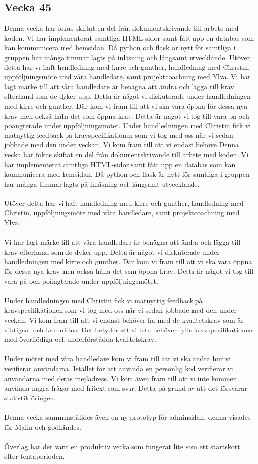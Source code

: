 \documentclass[12pt]{article}
\begin{document}
    \subsection{Vecka 45}
 Denna vecka har fokus skiftat en del från dokumentskrivande till arbete med koden. Vi har implementerat samtliga HTML-sidor  samt fått upp en databas som kan kommunicera med hemsidan. Då python och flask är nytt för samtliga i gruppen har många timmar lagts på inläsning och långsamt utvecklande.   Utöver detta har vi haft handledning med kirre och gunther, handledning med Christin, uppföljningsmöte med våra handledare, samt projektcoachning med Ylva.  Vi har lagt märke till att våra handledare är benägna att ändra och lägga till krav efterhand som de dyker upp. Detta är något vi diskuterade  under handledningen med kirre och gunther. Där kom vi fram till att vi ska vara öppna för dessa nya krav men också hålla det som öppna krav. Detta är något vi tog till vara på och poängterade under uppföljningsmötet.  Under handledningen med Christin fick vi matnyttig feedback på kravspecifikationen som vi tog med oss när vi sedan jobbade med den under veckan. Vi kom fram till att vi endast behöve
Denna vecka har fokus skiftat en del från dokumentskrivande till arbete med koden. Vi har implementerat samtliga HTML-sidor 
samt fått upp en databas som kan kommunicera med hemsidan. Då python och flask är nytt för samtliga i gruppen har många timmar lagts på
inläsning och långsamt utvecklande. 
\\
\\
Utöver detta har vi haft handledning med kirre och gunther, handledning med Christin, uppföljningsmöte med våra handledare, samt projektcoachning med Ylva.
\\
\\
Vi har lagt märke till att våra handledare är benägna att ändra och lägga till krav efterhand som de dyker upp. Detta är något vi diskuterade 
under handledningen med kirre och gunther. Där kom vi fram till att vi ska vara öppna för dessa nya krav men också hålla det som öppna krav.
Detta är något vi tog till vara på och poängterade under uppföljningsmötet.
\\
\\
Under handledningen med Christin fick vi matnyttig feedback på kravspecifikationen som vi tog med oss när vi sedan jobbade med den under veckan.
Vi kom fram till att vi endast behöver ha med de kvalitetskrav som är viktigast och kan mätas. Det betyder att vi inte behöver fylla 
kravspecifikationen med överflödiga och underförstådda kvalitetskrav.
\\
\\
Under mötet med våra handledare kom vi fram till att vi ska ändra hur vi verifierar användarna. Istället för att använda en personlig kod verifierar vi användarna
med deras mejladress. Vi kom även fram till att vi inte kommer använda några frågor med fritext som svar. Detta på grund av att det försvårar statistikföringen.
\\
\\
Denna vecka sammanställdes även en ny prototyp för adminsidan, denna visades för Malin och godkändes.
\\
\\
Överlag har det varit en produktiv vecka som fungerat lite som ett startskott efter tentaperioden.
\end{document}
